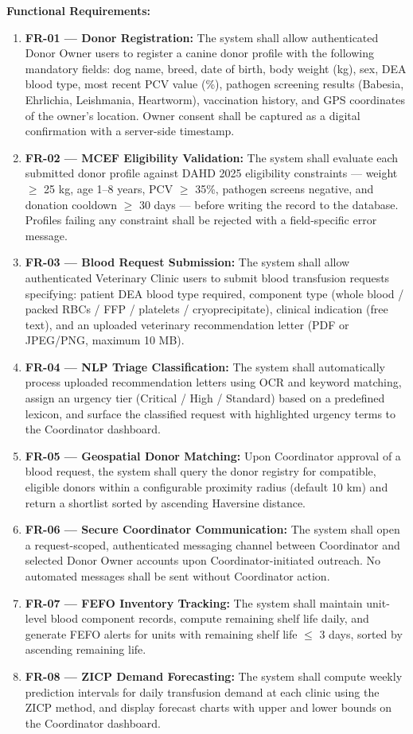 \documentclass[12pt,a4paper]{article}
\begin{document}
\textbf{Functional Requirements:}

\begin{enumerate}[leftmargin=1.8em, itemsep=0.4em]
    \item \textbf{FR-01 — Donor Registration:} The system shall allow authenticated Donor Owner users to register a canine donor profile with the following mandatory fields: dog name, breed, date of birth, body weight (kg), sex, DEA blood type, most recent PCV value (\%), pathogen screening results (Babesia, Ehrlichia, Leishmania, Heartworm), vaccination history, and GPS coordinates of the owner's location. Owner consent shall be captured as a digital confirmation with a server-side timestamp.
    \item \textbf{FR-02 — MCEF Eligibility Validation:} The system shall evaluate each submitted donor profile against DAHD 2025 eligibility constraints — weight $\geq$ 25 kg, age 1--8 years, PCV $\geq$ 35\%, pathogen screens negative, and donation cooldown $\geq$ 30 days — before writing the record to the database. Profiles failing any constraint shall be rejected with a field-specific error message.
    \item \textbf{FR-03 — Blood Request Submission:} The system shall allow authenticated Veterinary Clinic users to submit blood transfusion requests specifying: patient DEA blood type required, component type (whole blood / packed RBCs / FFP / platelets / cryoprecipitate), clinical indication (free text), and an uploaded veterinary recommendation letter (PDF or JPEG/PNG, maximum 10 MB).
    \item \textbf{FR-04 — NLP Triage Classification:} The system shall automatically process uploaded recommendation letters using OCR and keyword matching, assign an urgency tier (Critical / High / Standard) based on a predefined lexicon, and surface the classified request with highlighted urgency terms to the Coordinator dashboard.
    \item \textbf{FR-05 — Geospatial Donor Matching:} Upon Coordinator approval of a blood request, the system shall query the donor registry for compatible, eligible donors within a configurable proximity radius (default 10 km) and return a shortlist sorted by ascending Haversine distance.
    \item \textbf{FR-06 — Secure Coordinator Communication:} The system shall open a request-scoped, authenticated messaging channel between Coordinator and selected Donor Owner accounts upon Coordinator-initiated outreach. No automated messages shall be sent without Coordinator action.
    \item \textbf{FR-07 — FEFO Inventory Tracking:} The system shall maintain unit-level blood component records, compute remaining shelf life daily, and generate FEFO alerts for units with remaining shelf life $\leq$ 3 days, sorted by ascending remaining life.
    \item \textbf{FR-08 — ZICP Demand Forecasting:} The system shall compute weekly prediction intervals for daily transfusion demand at each clinic using the ZICP method, and display forecast charts with upper and lower bounds on the Coordinator dashboard.
\end{enumerate}
\end{document}
